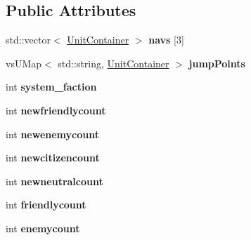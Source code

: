 \subsection*{Public Attributes}
\begin{DoxyCompactItemize}
\item 
std\+::vector$<$ \hyperlink{classUnitContainer}{Unit\+Container} $>$ {\bfseries navs} \mbox{[}3\mbox{]}\hypertarget{structStarSystem_1_1Statistics_a2d7b1a235b06d09049449703e7891b26}{}\label{structStarSystem_1_1Statistics_a2d7b1a235b06d09049449703e7891b26}

\item 
vs\+U\+Map$<$ std\+::string, \hyperlink{classUnitContainer}{Unit\+Container} $>$ {\bfseries jump\+Points}\hypertarget{structStarSystem_1_1Statistics_af54cca9bb37571f4889dd3a3e8330ce5}{}\label{structStarSystem_1_1Statistics_af54cca9bb37571f4889dd3a3e8330ce5}

\item 
int {\bfseries system\+\_\+faction}\hypertarget{structStarSystem_1_1Statistics_aaf381551986a1a28445d634e2ecccf8c}{}\label{structStarSystem_1_1Statistics_aaf381551986a1a28445d634e2ecccf8c}

\item 
int {\bfseries newfriendlycount}\hypertarget{structStarSystem_1_1Statistics_a138ab12050cae0f4900fcc85a0fd0234}{}\label{structStarSystem_1_1Statistics_a138ab12050cae0f4900fcc85a0fd0234}

\item 
int {\bfseries newenemycount}\hypertarget{structStarSystem_1_1Statistics_a5976a67118870d1255337c9ee4cd6d24}{}\label{structStarSystem_1_1Statistics_a5976a67118870d1255337c9ee4cd6d24}

\item 
int {\bfseries newcitizencount}\hypertarget{structStarSystem_1_1Statistics_a5f709e9f3aacc41c63eb640c1081d6fc}{}\label{structStarSystem_1_1Statistics_a5f709e9f3aacc41c63eb640c1081d6fc}

\item 
int {\bfseries newneutralcount}\hypertarget{structStarSystem_1_1Statistics_a6575327587d290d5b41ef64dc5cb02ea}{}\label{structStarSystem_1_1Statistics_a6575327587d290d5b41ef64dc5cb02ea}

\item 
int {\bfseries friendlycount}\hypertarget{structStarSystem_1_1Statistics_ae5fec57b2b849f303e3186bd7cf121e1}{}\label{structStarSystem_1_1Statistics_ae5fec57b2b849f303e3186bd7cf121e1}

\item 
int {\bfseries enemycount}\hypertarget{structStarSystem_1_1Statistics_ade7a28c2dd832276c6445e237caaa423}{}\label{structStarSystem_1_1Statistics_ade7a28c2dd832276c6445e237caaa423}


\end{DoxyCompactItemize}
